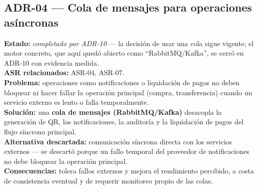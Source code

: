 \documentclass[11pt,a4paper]{article}
\begin{document}
\subsection*{ADR-04 --- Cola de mensajes para operaciones asíncronas}
\textbf{Estado:} \textit{completado por ADR-10} --- la decisión de usar una cola sigue vigente; el
motor concreto, que aquí quedó abierto como ``RabbitMQ/Kafka'', se cerró en ADR-10 con evidencia
medida.\\
\textbf{ASR relacionados:} ASR-04, ASR-07.\\
\textbf{Problema:} operaciones como notificaciones o liquidación de pagos no deben bloquear ni
hacer fallar la operación principal (compra, transferencia) cuando un servicio externo es lento o
falla temporalmente.\\
\textbf{Solución:} una \textbf{cola de mensajes (RabbitMQ/Kafka)} desacopla la generación de QR,
las notificaciones, la auditoría y la liquidación de pagos del flujo síncrono principal.\\
\textbf{Alternativa descartada:} comunicación síncrona directa con los servicios externos — se
descartó porque un fallo temporal del proveedor de notificaciones no debe bloquear la operación
principal.\\
\textbf{Consecuencias:} tolera fallos externos y mejora el rendimiento percibido, a costa de
consistencia eventual y de requerir monitoreo propio de las colas.
\end{document}

